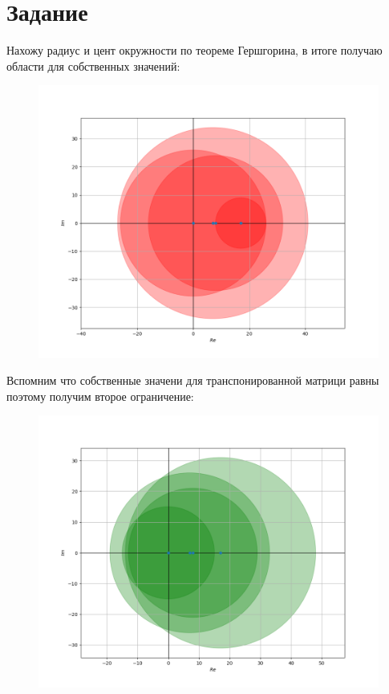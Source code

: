 \section{Задание}

Нахожу радиус и цент окружности по теореме Гершгорина, в итоге получаю области для 
собственных значений:

\begin{figure}[H]
    \centering
    \includegraphics[trim={0 0 0 0},clip,width=\textwidth]{Imgs/evs.png}
    \label{evs}
\end{figure}

Вспомним что собственные значени для транспонированной матрици равны 
поэтому получим второе ограничение:

\begin{figure}[H]
    \centering
    \includegraphics[trim={0 0 0 0},clip,width=\textwidth]{Imgs/evs_t.png}
    \label{evs_t}
\end{figure}

